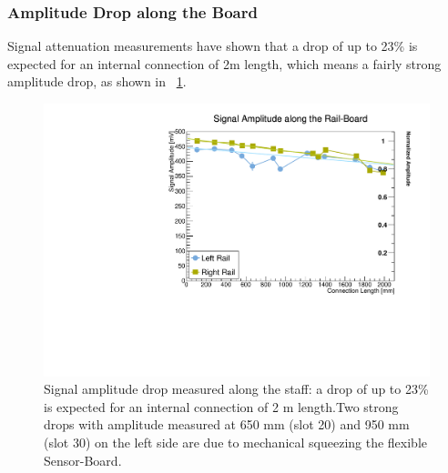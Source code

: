 \documentclass[../BTOF_summary.tex]{subfiles}
\begin{document}
\subsubsection{Amplitude Drop along the Board}
Signal attenuation measurements have shown that a drop of up to 23\% is expected for an internal connection of 2m length, which means a fairly strong amplitude drop, as shown in \fig~\ref{fig:SA}.

\begin{figure}[h!]
    \centering
    \includegraphics[scale=0.5]{Pictures/SignalAmplitude.pdf}
    \caption{Signal amplitude drop measured along the staff: a drop of up to 23\% is expected for an internal connection of 2 m length.Two strong drops with amplitude measured at 650 mm (slot 20) and 950 mm (slot 30) on the left side are due to mechanical squeezing the flexible Sensor-Board.}
    \label{fig:SA}
\end{figure}






\end{document}
